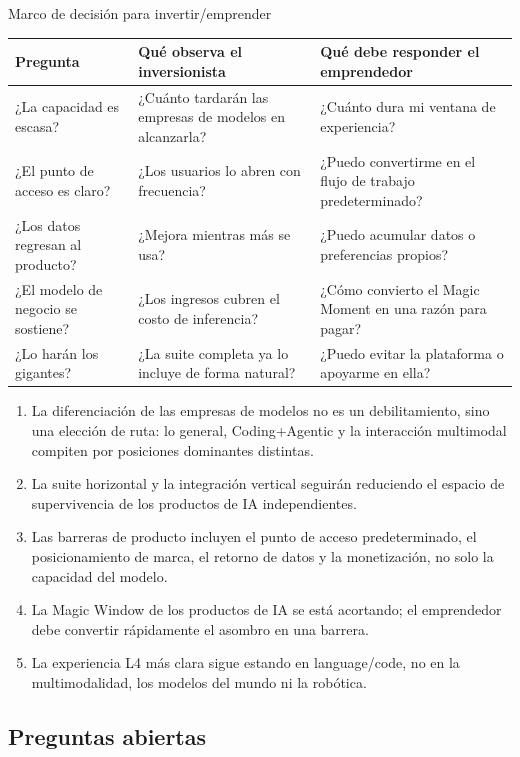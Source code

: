 \documentclass[a4paper]{article}
\begin{document}
\begin{knowledgebox}{Marco de decisión para invertir/emprender}
\begin{tabularx}{\textwidth}{p{}p{}X}
\toprule
Pregunta & Qué observa el inversionista & Qué debe responder el emprendedor \\
\midrule
¿La capacidad es escasa? & ¿Cuánto tardarán las empresas de modelos en alcanzarla? & ¿Cuánto dura mi ventana de experiencia? \\
¿El punto de acceso es claro? & ¿Los usuarios lo abren con frecuencia? & ¿Puedo convertirme en el flujo de trabajo predeterminado? \\
¿Los datos regresan al producto? & ¿Mejora mientras más se usa? & ¿Puedo acumular datos o preferencias propios? \\
¿El modelo de negocio se sostiene? & ¿Los ingresos cubren el costo de inferencia? & ¿Cómo convierto el Magic Moment en una razón para pagar? \\
¿Lo harán los gigantes? & ¿La suite completa ya lo incluye de forma natural? & ¿Puedo evitar la plataforma o apoyarme en ella? \\
\bottomrule
\end{tabularx}
\end{knowledgebox}

\begin{enumerate}
\item La diferenciación de las empresas de modelos no es un debilitamiento, sino una elección de ruta: lo general, Coding+Agentic y la interacción multimodal compiten por posiciones dominantes distintas.
\item La suite horizontal y la integración vertical seguirán reduciendo el espacio de supervivencia de los productos de IA independientes.
\item Las barreras de producto incluyen el punto de acceso predeterminado, el posicionamiento de marca, el retorno de datos y la monetización, no solo la capacidad del modelo.
\item La Magic Window de los productos de IA se está acortando; el emprendedor debe convertir rápidamente el asombro en una barrera.
\item La experiencia L4 más clara sigue estando en language/code, no en la multimodalidad, los modelos del mundo ni la robótica.
\end{enumerate}

\subsection{Preguntas abiertas}
\end{document}
